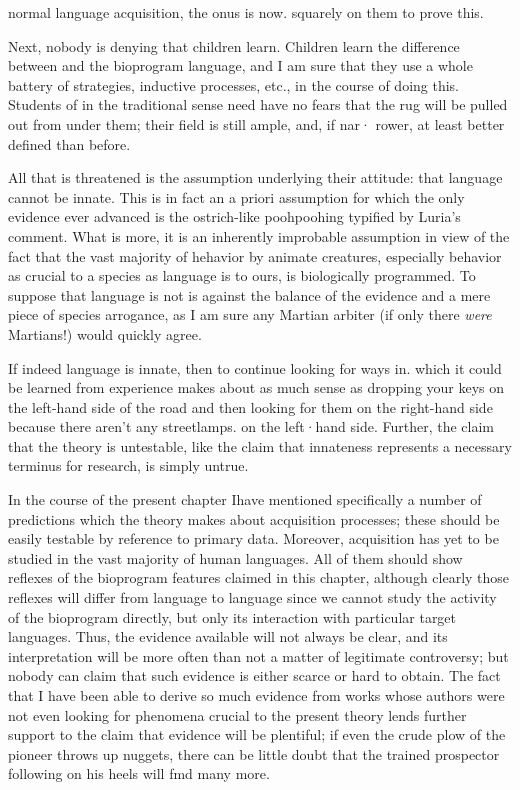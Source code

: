 {\textquotedbl}normal language acquisition, the onus is now. squarely on them to prove this.

Next, nobody is denying that children learn. Children   learn the difference between  and the bioprogram language, and I am sure that they use a whole battery of  strategies, inductive processes, etc., in the course of doing this. Students of  in the traditional sense need have no fears that the rug will be pulled out from under them; their field is still ample, and, if nar· rower, at least better defined than before.

All that is threatened is the assumption underlying their attitude: that language cannot be innate. This is in fact an a priori assumption for which the only evidence ever advanced is the ostrich-like pooh\-poohing typified by Luria's comment. What is more, it is an inherently improbable assumption in view of the fact that the vast majority of hehavior by animate creatures, especially behavior as crucial to a species as language is to ours, is biologically programmed. To suppose that language is not is against the balance of the evidence and a mere
piece of species arrogance, as I am sure any Martian arbiter (if only there \textit{were }Martians!) would quickly agree.

If indeed language is innate, then to continue looking for ways in. which it could be learned from experience makes about as much sense as dropping your keys on the left-hand side of the road and then looking for them on the right-hand side because there aren't any streetlamps. on the left·hand side. Further, the claim that the theory is untestable, like the claim that innateness represents a necessary terminus for research, is simply untrue.



In the course of the present chapter Ihave mentioned specifically a number of predictions which the theory makes about acquisition processes; these should be easily testable by reference to primary data. Moreover, acquisition has yet to be studied in the vast majority of human languages. All of them should show reflexes of the bioprogram features claimed in this chapter, although clearly those reflexes will differ from language to language since we cannot study the activity of the bioprogram directly, but only its interaction with particular target languages. Thus, the evidence available will not always be clear, and its interpretation will be more often than not a matter of legiti\-mate controversy; but nobody can claim that such evidence is either scarce or hard to obtain. The fact that I have been able to derive so much evidence from works whose authors were not even looking for phenomena crucial to the present theory lends further support to the claim that evidence will be plentiful; if even the crude plow of the pioneer throws up nuggets, there can be little doubt that the trained prospector following on his heels will fmd many more.

